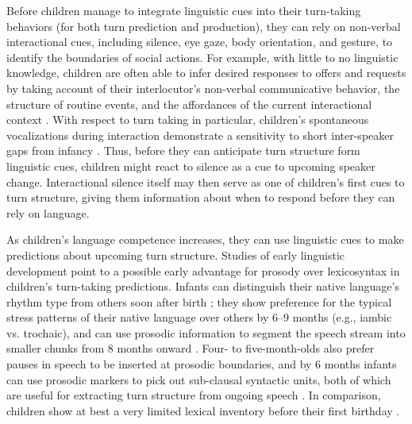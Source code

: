 \documentclass[authoryear, 12pt]{elsarticle}
\begin{document}
Before children manage to integrate linguistic cues into their turn-taking behaviors (for both turn prediction and production), they can rely on non-verbal interactional cues, including silence, eye gaze, body orientation, and gesture, to identify the boundaries of social actions. For example, with little to no linguistic knowledge, children are often able to infer desired responses to offers and requests by taking account of their interlocutor's non-verbal communicative behavior, the structure of routine events, and the affordances of the current interactional context \citep{reddy13, nomikou11, shatz78}. With respect to turn taking in particular, children's spontaneous vocalizations during interaction demonstrate a sensitivity to short inter-speaker gaps from infancy \citep{hilbrink2015}. Thus, before they can anticipate turn structure form linguistic cues, children might react to silence as a cue to upcoming speaker change. Interactional silence itself may then serve as one of children's first cues to turn structure, giving them information about when to respond before they can rely on language.

As children's language competence increases, they can use linguistic cues to make predictions about upcoming turn structure. Studies of early linguistic development point to a possible early advantage for prosody over lexicosyntax in children's turn-taking predictions. Infants can distinguish their native language's rhythm type from others soon after birth \citep{mehler1988, nazzi2003}; they show preference for the typical stress patterns of their native language over others by 6--9 months (e.g., iambic vs. trochaic), and can use prosodic information to segment the speech stream into smaller chunks from 8 months onward \citep{johnson2001, morgan1995}. Four- to five-month-olds also prefer pauses in speech to be inserted at prosodic boundaries, and by 6 months infants can use prosodic markers to pick out sub-clausal syntactic units, both of which are useful for extracting turn structure from ongoing speech \citep{jusczyk1995, soderstrom2003}. In comparison, children show at best a very limited lexical inventory before their first birthday \citep{bergelson2013, shi2010}.

\end{document}
